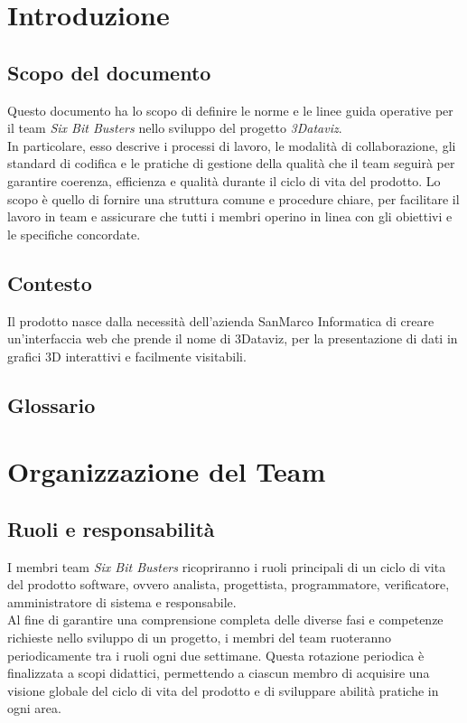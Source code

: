 \section{Introduzione}
\subsection{Scopo del documento}
    Questo documento ha lo scopo di definire le norme e le linee guida operative
    per il team \textit{Six Bit Busters} nello sviluppo del progetto
    \textit{3Dataviz}.\\ In particolare, esso descrive i processi di lavoro,
    le modalità di collaborazione, gli standard di codifica e le pratiche
    di gestione della qualità che il team seguirà per garantire coerenza, 
    efficienza e qualità durante il ciclo di vita del prodotto. 
    Lo scopo è quello di fornire una struttura comune e procedure chiare, per 
    facilitare il lavoro in team e assicurare che tutti i membri operino in 
    linea con gli obiettivi e le specifiche concordate.

\subsection{Contesto}
    Il prodotto nasce dalla necessità dell'azienda SanMarco Informatica di 
    creare un'interfaccia web che prende il nome di 3Dataviz, per la presentazione di dati in grafici 3D interattivi
    e facilmente visitabili.
\subsection{Glossario}

\newpage

\section{Organizzazione del Team}
\subsection{Ruoli e responsabilità}
    I membri team \textit{Six Bit Busters} ricopriranno i ruoli principali 
    di un ciclo di vita del prodotto software, ovvero analista, 
    progettista, programmatore, verificatore, amministratore di sistema e responsabile. 
    \\Al fine di garantire una comprensione completa delle diverse fasi 
    e competenze richieste nello sviluppo di un progetto, i membri del team 
    ruoteranno periodicamente tra i ruoli ogni due settimane. Questa rotazione 
    periodica è finalizzata a scopi didattici, permettendo a ciascun membro di 
    acquisire una visione globale del ciclo di vita del prodotto e di sviluppare 
    abilità pratiche in ogni area.
